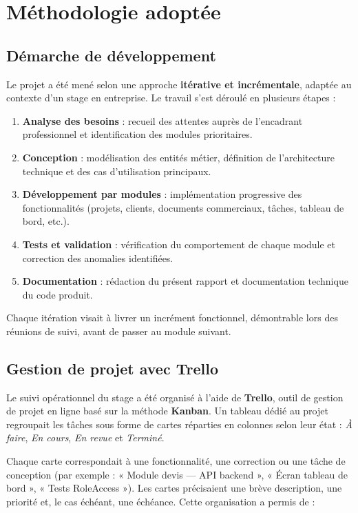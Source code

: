 \section{Méthodologie adoptée}

\subsection{Démarche de développement}

Le projet a été mené selon une approche \textbf{itérative et incrémentale}, adaptée au
contexte d'un stage en entreprise. Le travail s'est déroulé en plusieurs étapes :

\begin{enumerate}
  \item \textbf{Analyse des besoins} : recueil des attentes auprès de l'encadrant
  professionnel et identification des modules prioritaires.
  \item \textbf{Conception} : modélisation des entités métier, définition de l'architecture
  technique et des cas d'utilisation principaux.
  \item \textbf{Développement par modules} : implémentation progressive des fonctionnalités
  (projets, clients, documents commerciaux, tâches, tableau de bord, etc.).
  \item \textbf{Tests et validation} : vérification du comportement de chaque module et
  correction des anomalies identifiées.
  \item \textbf{Documentation} : rédaction du présent rapport et documentation technique
  du code produit.
\end{enumerate}

Chaque itération visait à livrer un incrément fonctionnel, démontrable lors des réunions
de suivi, avant de passer au module suivant.

\subsection{Gestion de projet avec Trello}

Le suivi opérationnel du stage a été organisé à l'aide de \textbf{Trello}, outil de
gestion de projet en ligne basé sur la méthode \textbf{Kanban}. Un tableau dédié au
projet regroupait les tâches sous forme de cartes réparties en colonnes selon leur
état : \textit{À faire}, \textit{En cours}, \textit{En revue} et \textit{Terminé}.

\medskip

Chaque carte correspondait à une fonctionnalité, une correction ou une tâche de
conception (par exemple : « Module devis --- API backend », « Écran tableau de bord »,
« Tests RoleAccess »). Les cartes précisaient une brève description, une priorité et,
le cas échéant, une échéance. Cette organisation a permis de :

